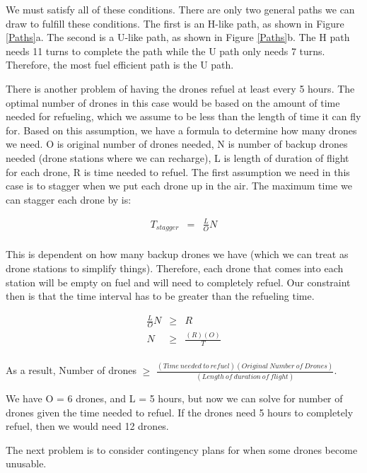 \documentclass{article}
\begin{document}
We must satisfy all of these conditions. There are only two general paths we can draw to fulfill these conditions. The first is an H-like path, as shown in Figure \ref{Paths}a. The second is a U-like path, as shown in Figure \ref{Paths}b. The H path needs 11 turns to complete the path while the U path only needs 7 turns. Therefore, the most fuel efficient path is the U path. 

There is another problem of having the drones refuel at least every 5 hours. The optimal number of drones in this case would be based on the amount of time needed for refueling, which we assume to be less than the length of time it can fly for. Based on this assumption, we have a formula to determine how many drones we need. O is original number of drones needed, N is number of backup drones needed (drone stations where we can recharge), L is length of duration of flight for each drone, R is time needed to refuel. The first assumption we need in this case is to stagger when we put each drone up in the air. The maximum time we can stagger each drone by is:

\begin{eqnarray*}
T_{stagger} &=& \frac{L}{O}N	\\
\end{eqnarray*}

This is dependent on how many backup drones we have  (which we can treat as drone stations to simplify things). Therefore, each drone that comes into each station will be empty on fuel and will need to completely refuel. Our constraint then is that the time interval has to be greater than the refueling time. 

\begin{eqnarray*}
\frac{L}{O}N &\geq & R	\\
N &\geq & \frac{(R)(O)}{T}	\\
\end{eqnarray*}

As a result, Number of drones $\geq$ $\frac{(Time~needed~to~refuel)(Original~Number~of~Drones)}{(Length~of~duration~of~flight)}$. 

We have O = 6 drones, and L = 5 hours, but now we can solve for number of drones given the time needed to refuel. If the drones need 5 hours to completely refuel, then we would need 12 drones. 

The next problem is to consider contingency plans for when some drones become unusable. 
\end{document}
